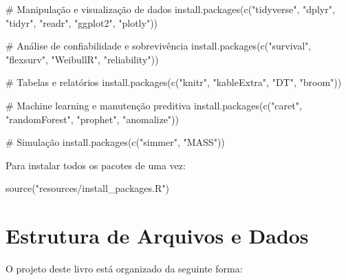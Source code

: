\documentclass[
  letterpaper,
]{book}
\newenvironment{Shaded}{\begin{snugshade}}{\end{snugshade}}
\newcommand{\CommentTok}[1]{\textcolor[rgb]{0.37,0.37,0.37}{#1}}
\newcommand{\FunctionTok}[1]{\textcolor[rgb]{0.28,0.35,0.67}{#1}}
\newcommand{\NormalTok}[1]{\textcolor[rgb]{0.00,0.23,0.31}{#1}}
\newcommand{\StringTok}[1]{\textcolor[rgb]{0.13,0.47,0.30}{#1}}
\begin{document}
\begin{Shaded}
\begin{Highlighting}[]
\CommentTok{\# Manipulação e visualização de dados}
\FunctionTok{install.packages}\NormalTok{(}\FunctionTok{c}\NormalTok{(}\StringTok{"tidyverse"}\NormalTok{, }\StringTok{"dplyr"}\NormalTok{, }\StringTok{"tidyr"}\NormalTok{, }\StringTok{"readr"}\NormalTok{, }\StringTok{"ggplot2"}\NormalTok{, }\StringTok{"plotly"}\NormalTok{))}

\CommentTok{\# Análise de confiabilidade e sobrevivência}
\FunctionTok{install.packages}\NormalTok{(}\FunctionTok{c}\NormalTok{(}\StringTok{"survival"}\NormalTok{, }\StringTok{"flexsurv"}\NormalTok{, }\StringTok{"WeibullR"}\NormalTok{, }\StringTok{"reliability"}\NormalTok{))}

\CommentTok{\# Tabelas e relatórios}
\FunctionTok{install.packages}\NormalTok{(}\FunctionTok{c}\NormalTok{(}\StringTok{"knitr"}\NormalTok{, }\StringTok{"kableExtra"}\NormalTok{, }\StringTok{"DT"}\NormalTok{, }\StringTok{"broom"}\NormalTok{))}

\CommentTok{\# Machine learning e manutenção preditiva}
\FunctionTok{install.packages}\NormalTok{(}\FunctionTok{c}\NormalTok{(}\StringTok{"caret"}\NormalTok{, }\StringTok{"randomForest"}\NormalTok{, }\StringTok{"prophet"}\NormalTok{, }\StringTok{"anomalize"}\NormalTok{))}

\CommentTok{\# Simulação}
\FunctionTok{install.packages}\NormalTok{(}\FunctionTok{c}\NormalTok{(}\StringTok{"simmer"}\NormalTok{, }\StringTok{"MASS"}\NormalTok{))}
\end{Highlighting}
\end{Shaded}

Para instalar todos os pacotes de uma vez:

\begin{Shaded}
\begin{Highlighting}[]
\FunctionTok{source}\NormalTok{(}\StringTok{"resources/install\_packages.R"}\NormalTok{)}
\end{Highlighting}
\end{Shaded}

\section*{Estrutura de Arquivos e
Dados}\label{estrutura-de-arquivos-e-dados}


O projeto deste livro está organizado da seguinte forma:
\end{document}
